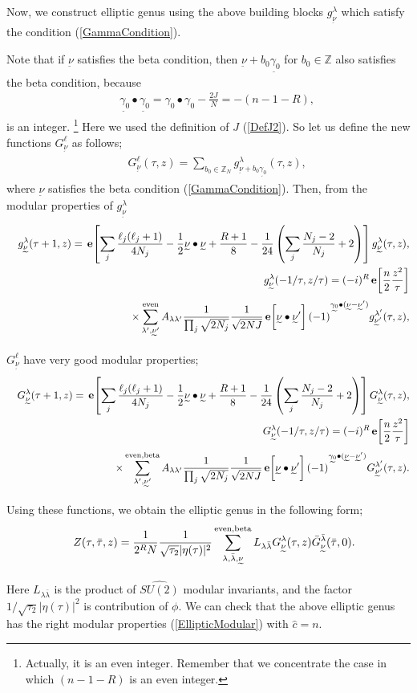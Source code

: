 \documentclass[a4paper,12pt]{article}
\numberwithin{equation}{section}
\newcommand{\ch}{\hat{c}}
\newcommand{\Zb}{{\mathbb Z}}
\newcommand{\e}[1]{\,{\bf e}\!\left[#1\right]}
\newcommand{\nt}{\underset{\widetilde{}}{\nu}}
\newcommand{\gt}{\underset{\widetilde{}}{\gamma_{0}}}
\newcommand{\taub}{\bar{\tau}}
\newcommand{\lambdab}{\bar{\lambda}}
\begin{document}
Now, we construct elliptic genus 
using the above building blocks $g_{\nt}^{\lambda}$ 
which satisfy the condition (\ref{GammaCondition}).

Note that if $\nt$ satisfies the beta condition, then $\nt+b_0\gt$ 
for $b_0\in \Zb$ also
satisfies the beta condition, because
\begin{eqnarray*}
 && \gt\bullet\gt=\gamma_0\bullet\gamma_0-\frac{2J}{N}=-(n-1-R),
\end{eqnarray*}
is an integer.
\footnote{
Actually, it is an even integer. Remember that we concentrate the case
in which $(n-1-R)$ is an even integer.}
Here we used the definition of $J$ (\ref{DefJ2}).
So let us define the new functions $G_{\nt}^{\ell}$
 as follows;
\begin{eqnarray*}
 && G_{\nt}^{\ell}(\tau,z)=\sum_{b_0\in \Zb_{N}}
g_{\nt+b_0\gt}^{\lambda}(\tau,z),
\end{eqnarray*}
where $\nt$ satisfies the beta condition (\ref{GammaCondition}).
Then, from the modular properties of $g_{\nt}^{\lambda}$
\begin{eqnarray*}
 && g_{\nt}^{\lambda}(\tau+1,z)=
\e{\sum_j\frac{\ell_j(\ell_j+1)}{4N_j}-\frac12 \nt\bullet\nt
+\frac{R+1}{8}-\frac1{24}\left(\sum_{j}\frac{N_j-2}{N_j}+2\right)}
g_{\nt}^{\lambda}(\tau,z),\\
 && g_{\nt}^{\lambda}(-1/\tau,z/\tau)=(-i)^R \e{\frac n2 \frac{z^2}{\tau}}
\\&&\hspace{2cm}\times
\sum_{\lambda',\nt'}^{\rm even}
A_{\lambda\lambda'}\frac{1}{\prod_j\sqrt{2N_j}}
\frac{1}{\sqrt{2NJ}}\e{\nt\bullet\nt'}(-1)^{\gt\bullet(\nt-\nt')}
g_{\nt'}^{\lambda'}(\tau,z),
\end{eqnarray*}
$G_{\nt}^{\ell}$ have very good modular properties;
\begin{eqnarray*}
 && G_{\nt}^{\lambda}(\tau+1,z)=
\e{\sum_j\frac{\ell_j(\ell_j+1)}{4N_j}-\frac12 \nt\bullet\nt
+\frac{R+1}{8}-\frac1{24}\left(\sum_{j}\frac{N_j-2}{N_j}+2\right)}
G_{\nt}^{\lambda}(\tau,z),\\
 && G_{\nt}^{\lambda}(-1/\tau,z/\tau)=(-i)^R \e{\frac n2 \frac{z^2}{\tau}}
\\&&\hspace{2cm}\times
\sum_{\lambda',\nt'}^{\rm even,beta}
A_{\lambda\lambda'}\frac{1}{\prod_j\sqrt{2N_j}}
\frac{1}{\sqrt{2NJ}}\e{\nt\bullet\nt'}(-1)^{\gt\bullet(\nt-\nt')}
G_{\nt'}^{\lambda'}(\tau,z).
\end{eqnarray*}
Using these functions, we obtain the elliptic genus in the following
form;
\begin{eqnarray*}
 && Z(\tau,\taub,z)=\frac1{2^{R}N}
\frac{1}{\sqrt{\tau_2}|\eta(\tau)|^2}
\sum_{\lambda,\lambdab,\nt}^{\rm even,beta}
L_{\lambda\lambdab}G_{\nt}^{\lambda}(\tau,z)\bar G_{\nt}^{\lambdab}(\taub,0).
\end{eqnarray*}
Here $L_{\lambda\lambdab}$ is the product of $\widehat{SU(2)}$ modular
invariants, and the factor $1/\sqrt{\tau_2}|\eta(\tau)|^2$ is
contribution of $\phi$. 
We can check that the above elliptic genus has the right modular
properties (\ref{EllipticModular}) with $\ch=n$.
\end{document}
